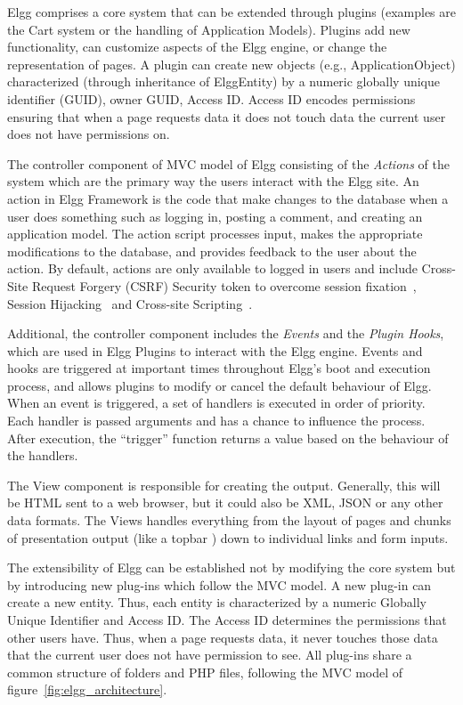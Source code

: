 Elgg comprises a core system that can be extended through plugins (examples are the Cart system or the handling of Application Models). Plugins add new functionality, can customize aspects of the Elgg engine, or change the representation of pages.
A plugin can create new objects (e.g., ApplicationObject) characterized (through inheritance of ElggEntity) by a numeric globally unique identifier (GUID), owner GUID, Access ID. Access ID encodes permissions ensuring that when a page requests data it does not touch data the current user does not have permissions on. 

The controller component of MVC model of Elgg consisting of the \emph{Actions} of the system which are the primary way the users interact with the Elgg site. An action in Elgg Framework is the code that make changes to the database when a user does something such as logging in, posting a comment, and creating an application model. The action script processes input, makes the appropriate modifications to the database, and provides feedback to the user about the action. By default, actions are only available to logged in users and include Cross-Site Request Forgery (CSRF) Security token to overcome session fixation~\cite{kolvsek2002session}, Session Hijacking~\cite{burgersposter} and Cross-site Scripting~\cite{thamescomparing}.

Additional, the controller component includes the \emph{Events} and the \emph{Plugin Hooks}, which are used in Elgg Plugins to interact with the Elgg engine. Events and hooks are triggered at important times throughout Elgg’s boot and execution process, and allows plugins to modify or cancel the default behaviour of Elgg. When an event is triggered, a set of handlers is executed in order of priority. Each handler is passed arguments and has a chance to influence the process. After execution, the ``trigger'' function returns a value based on the behaviour of the handlers.

The View component is responsible for creating the output. Generally, this will be HTML sent to a web browser, but it could also be XML, JSON or any other data formats. The Views handles everything from the layout of pages and chunks of presentation output (like a topbar ) down to individual links and form inputs.

The extensibility of Elgg can be established not by modifying the core system but by introducing new plug-ins which follow the MVC model. A new plug-in can create a new entity. Thus, each entity is characterized by a numeric Globally Unique Identifier and Access ID. The Access ID determines the permissions that other users have. Thus, when a page requests data, it never touches those data that the current user does not have permission to see. All plug-ins share a common structure of folders and PHP files, following the MVC model of figure~\ref{fig:elgg_architecture}. 

